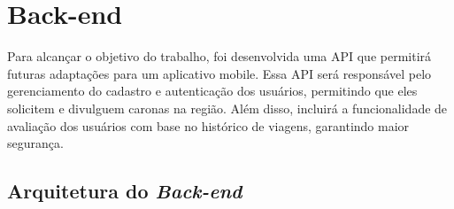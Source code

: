 \section{Back-end}

Para alcançar o objetivo do trabalho, foi desenvolvida uma API que permitirá futuras adaptações para um aplicativo mobile. Essa API será responsável pelo gerenciamento do cadastro e autenticação dos usuários, permitindo que eles solicitem e divulguem caronas na região. Além disso, incluirá a funcionalidade de avaliação dos usuários com base no histórico de viagens, garantindo maior segurança.

\subsection{Arquitetura do \textit{Back-end}}

